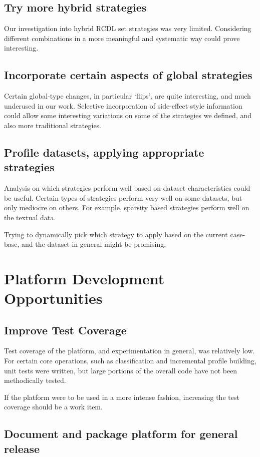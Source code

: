 \documentclass[a4paper,11pt]{report}
\begin{document}
\subsection{Try more hybrid strategies}
Our investigation into hybrid RCDL set strategies was very limited. Considering different combinations in a more meaningful and systematic way could prove interesting.

\subsection{Incorporate certain aspects of global strategies}
Certain global-type changes, in particular `flips', are quite interesting, and much underused in our work. Selective incorporation of side-effect style information could allow some interesting variations on some of the strategies we defined, and also more traditional strategies.

\subsection{Profile datasets, applying appropriate strategies}
Analysis on which strategies perform well based on dataset characteristics could be useful. Certain types of strategies perform very well on some datasets, but only mediocre on others. For example, sparsity based strategies perform well on the textual data.

Trying to dynamically pick which strategy to apply based on the current case-base, and the dataset in general might be promising.

\section{Platform Development Opportunities}

\subsection{Improve Test Coverage}

Test coverage of the platform, and experimentation in general, was relatively low. For certain core operations, such as classification and incremental profile building, unit tests were written, but large portions of the overall code have not been methodically tested. 

If the platform were to be used in a more intense fashion, increasing the test coverage should be a work item.

\subsection{Document and package platform for general release}
\end{document}
